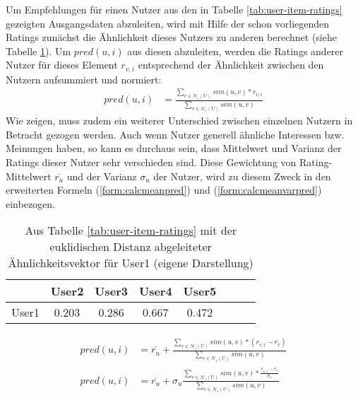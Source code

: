 Um Empfehlungen für einen Nutzer aus den in Tabelle \ref{tab:user-item-ratings} gezeigten Ausgangsdaten abzuleiten, wird mit Hilfe der schon vorliegenden Ratings zunächst die Ähnlichkeit dieses Nutzers zu anderen berechnet (siehe Tabelle \ref{tab:user-user-sim}). Um $pred(u,i)$ aus diesen abzuleiten, werden die Ratings anderer Nutzer für dieses Element $r_{v,i}$ entsprechend der Ähnlichkeit zwischen den Nutzern aufsummiert und normiert:
\begin{align}
pred(u,i) & = \frac{ \sum_{v \in \mathcal{N}_i(U)} sim(u, v)*r_{v,i}}{ \sum_{v \in \mathcal{N}_i(U)} sim(u,v) } \label{form:calcpred}
\end{align}
Wie \citep{Herlocker:2002:EAD:593967.594047} zeigen, muss zudem ein weiterer Unterschied zwischen einzelnen Nutzern in Betracht gezogen werden. Auch wenn Nutzer generell ähnliche Interessen bzw. Meinungen haben, so kann es durchaus sein, dass Mittelwert und Varianz der Ratings dieser Nutzer sehr verschieden sind. Diese Gewichtung von Rating-Mittelwert $\overline{r_u}$ und der Varianz  $\sigma_u$ der Nutzer, wird zu diesem Zweck in den erweiterten Formeln (\ref{form:calcmeanpred}) und (\ref{form:calcmeanvarpred}) einbezogen. \citep{hb_04,Huete:2012:UPA:2206442.2206675}
\begin{table}[ht]
  \centering
\begin{minipage}[b]{4in}
  \begin{tabular}{ | l || c | c | c | c | c | c | c | }
    \hline
           & User2 & User3 & User4 & User5 \\ \hline
User1 &    0.203 &	0.286 &	0.667 & 0.472 \\
    \hline
  \end{tabular}
  \caption{\footnotesize Aus Tabelle \ref{tab:user-item-ratings} mit der euklidischen Distanz abgeleiteter Ähnlichkeitsvektor für User1 { \scriptsize (eigene Darstellung)}}
  \label{tab:user-user-sim}
\end{minipage}
\end{table}
\begin{align}
pred(u, i) & = \overline{r_u} + \frac{ \sum_{v \in \mathcal{N}_i(U)} sim(u, v)*(r_{v,i}-\overline{r_v}) } { \sum_{v \in \mathcal{N}_i(U)} sim(u,v) } \label{form:calcmeanpred} \\
pred(u, i) & = \overline{r_u} + \sigma_u \frac{ \sum_{v \in \mathcal{N}_i(U)} sim(u, v)*\frac{r_{v,i}-\overline{r_v}}{\sigma_v} } { \sum_{v \in \mathcal{N}_i(U)} sim(u,v) } \label{form:calcmeanvarpred}
\end{align}

